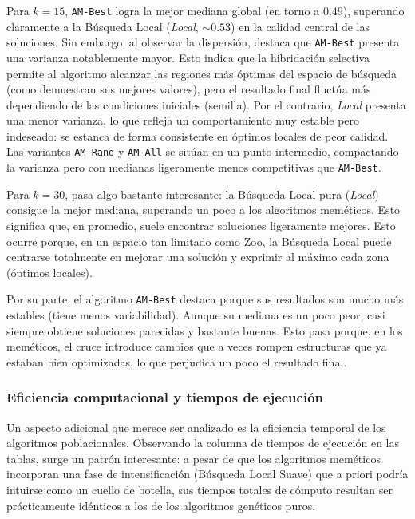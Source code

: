 \documentclass[a4paper,12pt]{article}%
\begin{document}
Para $k=15$, \texttt{AM-Best} logra la mejor mediana global (en torno a $0.49$), superando claramente a la Búsqueda Local (\textit{Local}, $\sim 0.53$) en la calidad central de las soluciones. Sin embargo, al observar la dispersión, destaca que \texttt{AM-Best} presenta una varianza notablemente mayor. Esto indica que la hibridación selectiva permite al algoritmo alcanzar las regiones más óptimas del espacio de búsqueda (como demuestran sus mejores valores), pero el resultado final fluctúa más dependiendo de las condiciones iniciales (semilla). Por el contrario, \textit{Local} presenta una menor varianza, lo que refleja un comportamiento muy estable pero indeseado: se estanca de forma consistente en óptimos locales de peor calidad. Las variantes \texttt{AM-Rand} y \texttt{AM-All} se sitúan en un punto intermedio, compactando la varianza pero con medianas ligeramente menos competitivas que \texttt{AM-Best}.

Para $k=30$, pasa algo bastante interesante: la Búsqueda Local pura (\textit{Local}) consigue la mejor mediana, superando un poco a los algoritmos meméticos. Esto significa que, en promedio, suele encontrar soluciones ligeramente mejores. Esto ocurre porque, en un espacio tan limitado como Zoo, la Búsqueda Local puede centrarse totalmente en mejorar una solución y exprimir al máximo cada zona (óptimos locales).

Por su parte, el algoritmo \texttt{AM-Best} destaca porque sus resultados son mucho más estables (tiene menos variabilidad). Aunque su mediana es un poco peor, casi siempre obtiene soluciones parecidas y bastante buenas. Esto pasa porque, en los meméticos, el cruce introduce cambios que a veces rompen estructuras que ya estaban bien optimizadas, lo que perjudica un poco el resultado final.


\subsubsection{Eficiencia computacional y tiempos de ejecución}

\noindent Un aspecto adicional que merece ser analizado es la eficiencia temporal de los algoritmos poblacionales. Observando la columna de tiempos de ejecución en las tablas, surge un patrón interesante: a pesar de que los algoritmos meméticos incorporan una fase de intensificación (Búsqueda Local Suave) que a priori podría intuirse como un cuello de botella, sus tiempos totales de cómputo resultan ser prácticamente idénticos a los de los algoritmos genéticos puros.
\end{document}
